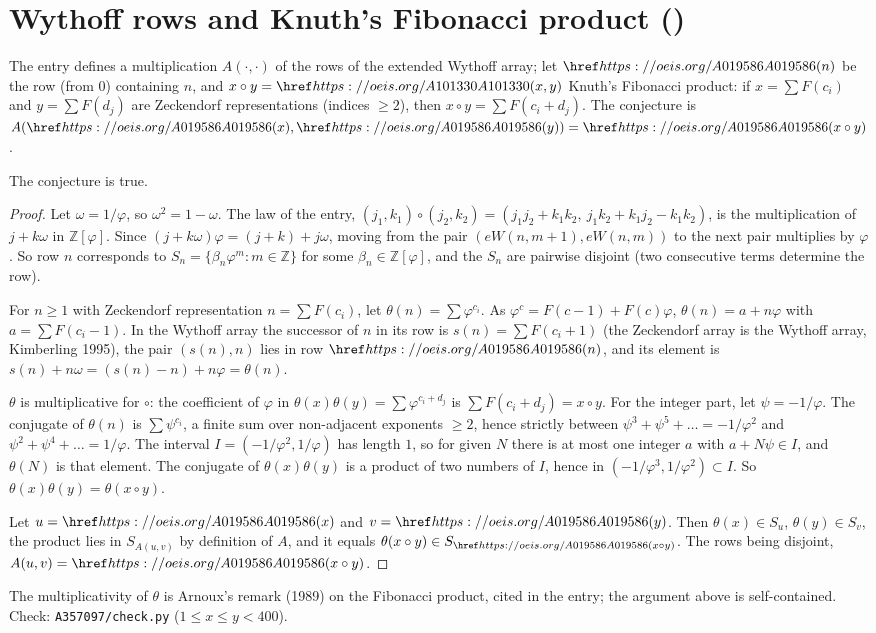 \section{Wythoff rows and Knuth's Fibonacci product ()}\label{s:A357097}
The entry defines a multiplication $A(\cdot,\cdot)$ of the rows of the extended Wythoff array; let
$\oeis{A019586}(n)$ be the row (from $0$) containing $n$, and $x\circ y=\oeis{A101330}(x,y)$ Knuth's Fibonacci
product: if $x=\sum F(c_i)$ and $y=\sum F(d_j)$ are Zeckendorf representations (indices $\ge2$), then
$x\circ y=\sum F(c_i+d_j)$. The conjecture is $A(\oeis{A019586}(x),\oeis{A019586}(y))=\oeis{A019586}(x\circ y)$.
\begin{theorem} The conjecture is true.\end{theorem}
\begin{proof} Let $\omega=1/\varphi$, so $\omega^2=1-\omega$. The law of the entry,
$(j_1,k_1)\circ(j_2,k_2)=(j_1j_2+k_1k_2,\ j_1k_2+k_1j_2-k_1k_2)$, is the multiplication of $j+k\omega$ in
$\mathbb{Z}[\varphi]$. Since $(j+k\omega)\varphi=(j+k)+j\omega$, moving from the pair $(eW(n,m+1),eW(n,m))$ to the next
pair multiplies by $\varphi$. So row $n$ corresponds to $S_n=\{\beta_n\varphi^m:m\in\mathbb{Z}\}$ for some
$\beta_n\in\mathbb{Z}[\varphi]$, and the $S_n$ are pairwise disjoint (two consecutive terms determine the row).

For $n\ge1$ with Zeckendorf representation $n=\sum F(c_i)$, let $\theta(n)=\sum\varphi^{c_i}$. As
$\varphi^c=F(c-1)+F(c)\varphi$, $\theta(n)=a+n\varphi$ with $a=\sum F(c_i-1)$. In the Wythoff array the successor of
$n$ in its row is $s(n)=\sum F(c_i+1)$ (the Zeckendorf array is the Wythoff array, Kimberling 1995), the pair
$(s(n),n)$ lies in row $\oeis{A019586}(n)$, and its element is $s(n)+n\omega=(s(n)-n)+n\varphi=\theta(n)$.

$\theta$ is multiplicative for $\circ$: the coefficient of $\varphi$ in $\theta(x)\theta(y)=\sum\varphi^{c_i+d_j}$ is
$\sum F(c_i+d_j)=x\circ y$. For the integer part, let $\psi=-1/\varphi$. The conjugate of $\theta(n)$ is
$\sum\psi^{c_i}$, a finite sum over non-adjacent exponents $\ge2$, hence strictly between
$\psi^3+\psi^5+\dots=-1/\varphi^2$ and $\psi^2+\psi^4+\dots=1/\varphi$. The interval $I=(-1/\varphi^2,1/\varphi)$ has length
$1$, so for given $N$ there is at most one integer $a$ with $a+N\psi\in I$, and $\theta(N)$ is that element. The
conjugate of $\theta(x)\theta(y)$ is a product of two numbers of $I$, hence in $(-1/\varphi^3,1/\varphi^2)\subset I$.
So $\theta(x)\theta(y)=\theta(x\circ y)$.

Let $u=\oeis{A019586}(x)$ and $v=\oeis{A019586}(y)$. Then $\theta(x)\in S_u$, $\theta(y)\in S_v$, the product lies in
$S_{A(u,v)}$ by definition of $A$, and it equals $\theta(x\circ y)\in S_{\oeis{A019586}(x\circ y)}$. The rows being
disjoint, $A(u,v)=\oeis{A019586}(x\circ y)$. \end{proof}
The multiplicativity of $\theta$ is Arnoux's remark (1989) on the Fibonacci product, cited in the entry; the
argument above is self-contained. Check: \texttt{A357097/check.py} ($1\le x\le y<400$).

